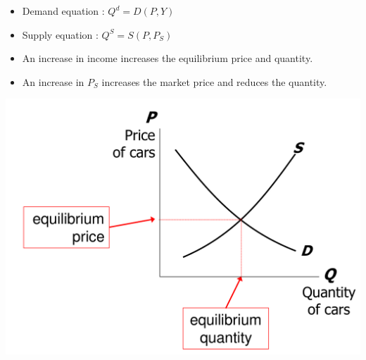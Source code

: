 \documentclass[lang=cn,10pt,green]{elegantbook}
\begin{document}
\begin{minipage}{0.48\textwidth}
    \begin{itemize}
        \item Demand equation : $Q^d = D(P,Y)$
        \item Supply equation : $Q^S = S(P,P_S)$
        \item An increase in income increases the equilibrium price and quantity.
        \item An increase in $P_S$ increases the market price and reduces the quantity.
    \end{itemize}
\end{minipage}%
\begin{minipage}{0.48\textwidth}
    \centering
    \includegraphics[width=\linewidth]{image/equilibrium of cars market.png}
\end{minipage}
\end{document}
